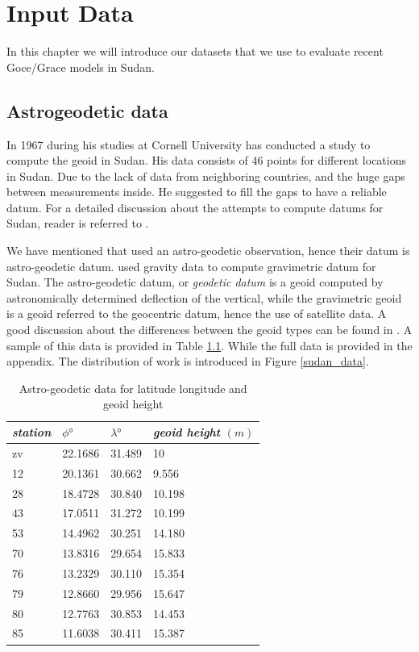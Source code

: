 \chapter{Input Data}

In this chapter we will introduce our datasets that we use to evaluate recent Goce/Grace models in Sudan. 

\section{Astrogeodetic data}

In 1967 \cite{osman} during his studies at Cornell University has conducted a study to compute the geoid in Sudan. His data consists of 46 points for different locations in Sudan. Due to the lack of data from neighboring countries, and the huge gaps between measurements inside. He suggested to fill the gaps to have a reliable datum. For a detailed discussion about the attempts to compute datums for Sudan, reader is referred to \citep{ahmed_similar}. 

We have mentioned that \citet{osman} used an astro-geodetic observation, hence their datum is astro-geodetic datum. \citet{ahmed_msc} used gravity data to compute gravimetric datum for Sudan. The astro-geodetic datum, or \emph{geodetic datum} is a geoid computed by astronomically determined deflection of the vertical, while the gravimetric geoid is a geoid referred to the geocentric datum, hence the use of satellite data. A good discussion about the differences between the geoid types can be found in \cite{vanicek}. A sample of this data is provided in Table \ref{table:sudan_astro_data}. While the full data is provided in the appendix. The distribution of \citep{osman} work is introduced in Figure \ref{sudan_data}. 

\begin{table}[]
	\centering
	\caption{Astro-geodetic data for latitude longitude and geoid height}
	\label{table:sudan_astro_data}
		\begin{tabular}{@{}llll@{}}
			\toprule
			\emph{station} & $\phi \si{\degree}$  & $\lambda \si{\degree}$ & \emph{geoid height} $(m)$\\ \midrule
			
			zv & 22.1686 & 31.489 & 10\\
			12 & 20.1361 & 30.662 & 9.556\\
			28 & 18.4728 & 30.840 & 10.198\\
			43 & 17.0511 & 31.272 & 10.199\\
			53 & 14.4962 & 30.251 & 14.180\\
			70 & 13.8316 & 29.654 & 15.833\\
			76 & 13.2329 & 30.110 & 15.354\\
			79 &12.8660 & 29.956 & 15.647\\
			80 &12.7763 & 30.853 & 14.453\\
			85 &11.6038 & 30.411 & 15.387\\ \bottomrule
			
		\end{tabular}
\end{table}


